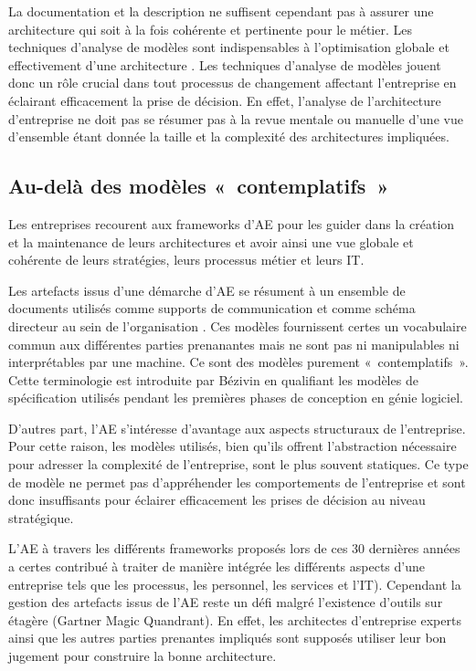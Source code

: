 La documentation et la description ne suffisent cependant pas à assurer une architecture qui soit à la fois cohérente et pertinente pour le métier. Les techniques d'analyse de modèles sont indispensables à l'optimisation globale et effectivement d'une architecture \cite{lankhorst2009enterprise}. Les techniques d'analyse de modèles jouent donc un rôle crucial dans tout processus de changement affectant l'entreprise en éclairant efficacement la prise de décision. En effet, l'analyse de l'architecture d'entreprise ne doit pas se résumer pas à la revue mentale ou manuelle d'une vue d'ensemble étant donnée la taille et la complexité des architectures impliquées.

	\subsection{Au-delà des modèles «~contemplatifs~»}

Les entreprises recourent aux frameworks d'AE pour les guider dans la création et la maintenance de leurs architectures et avoir ainsi une vue globale et cohérente de leurs stratégies, leurs processus métier et leurs IT.

Les artefacts issus d'une démarche d'AE se résument à un ensemble de documents utilisés comme supports de communication et comme schéma directeur au sein de l'organisation \cite{kulkarni_modelling_2013} \cite{clark_towards_2014}. Ces modèles fournissent certes un vocabulaire commun aux différentes parties prenanantes mais ne sont pas ni manipulables ni interprétables par une machine. Ce sont des modèles purement «~contemplatifs~». Cette terminologie est introduite par Bézivin en qualifiant les modèles de spécification utilisés pendant les premières phases de conception en génie logiciel. 

D'autres part, l'AE s'intéresse d'avantage aux aspects structuraux de l'entreprise. Pour cette raison, les modèles utilisés, bien qu'ils offrent l'abstraction nécessaire pour adresser la complexité de l'entreprise, sont le plus souvent statiques. Ce type de modèle ne permet pas d'appréhender les comportements de l'entreprise et sont donc insuffisants pour éclairer efficacement les prises de décision au niveau stratégique.

L'AE à travers les différents frameworks proposés lors de ces 30 dernières années a certes contribué à traiter de manière intégrée les différents aspects d'une entreprise tels que les processus, les personnel, les services et l'IT). Cependant la gestion des artefacts issus de l'AE reste un défi \cite{zachman1997enterprise} malgré l'existence d'outils sur étagère (Gartner Magic Quandrant). En effet, les architectes d'entreprise experts ainsi que les autres parties prenantes impliqués sont supposés utiliser leur bon jugement pour construire la bonne architecture. 


